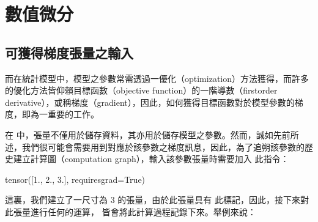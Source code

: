 \documentclass[letterpaper,10pt,english]{sphinxmanual}
\begin{document}
\begin{sphinxVerbatim}[commandchars=\\\{\}]
 
\end{sphinxVerbatim}


\section{數值微分}
\label{\detokenize{notebook/lab-torch-diff-opt:id1}}

\subsection{可獲得梯度張量之輸入}
\label{\detokenize{notebook/lab-torch-diff-opt:id2}}
而在統計模型中，模型之參數常需透過一優化（optimization）方法獲得，而許多的優化方法皆仰賴目標函數（objective function）的一階導數（first\sphinxhyphen{}order derivative），或稱梯度（gradient），因此，如何獲得目標函數對於模型參數的梯度，即為一重要的工作。

在  中，張量不僅用於儲存資料，其亦用於儲存模型之參數。然而，誠如先前所述，我們很可能會需要用到對應於該參數之梯度訊息，因此，為了追朔該參數的歷史建立計算圖（computation graph），輸入該參數張量時需要加入  此指令：

\begin{sphinxVerbatim}[commandchars=\\\{\}]
  \PYG{p}{[}  \PYG{p}{]}
                   
\end{sphinxVerbatim}

\begin{sphinxVerbatim}[commandchars=\\\{\}]
tensor([1., 2., 3.], requires\PYGZus{}grad=True)
\end{sphinxVerbatim}

這裏，我們建立了一尺寸為 \(3\) 的張量，由於此張量具有  此標記，因此，接下來對此張量進行任何的運算， 皆會將此計算過程記錄下來。舉例來說：

\begin{sphinxVerbatim}[commandchars=\\\{\}]
      
    
 
 
\end{sphinxVerbatim}
\end{document}
